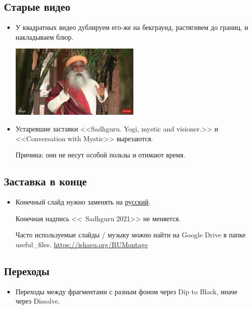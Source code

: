 \documentclass[
a4paper, %
12pt, %
article,
onecolumn, %
openany, %
]{memoir}
\begin{document}
\subsection{Старые видео}

\begin{itemize}

\item У квадратных видео дублируем его-же на бекграунд, растягивем до границ, и накладываем блюр.

	\begin{center} \includegraphics[width=0.5\textwidth]{tooWide}  \end{center}

\item Устаревшие заставки <<Sadhguru. Yogi, mystic and visioner.>> и <<Conversation with Mystic>> вырезаются. 

    {\color{gray}Причина: они не несут особой пользы и отнмают время.}
\end{itemize}

\subsection{Заставка в конце}

\begin{itemize}
    \item Конечный слайд нужно заменять на \href{https://drive.google.com/file/d/11NbSgvq8LbxDcy-a2WY5OJTKUZKcZx88/view?usp=sharing}{русский}. 

	Конечная надпись <<\textcopyright\ Sadhguru 2021>> не меняется.

    Часто используемые слайды / музыку можно найти на Google Drive в папке
    useful\_files.
\href{https://ishaeu.org/RUMontage}{https://ishaeu.org/RUMontage}
\end{itemize}


\subsection{Переходы}
\begin{itemize}
    \item Переходы между фрагментами с разным фоном через Dip to Black, иначе через Dissolve.
\end{itemize}
\end{document}

